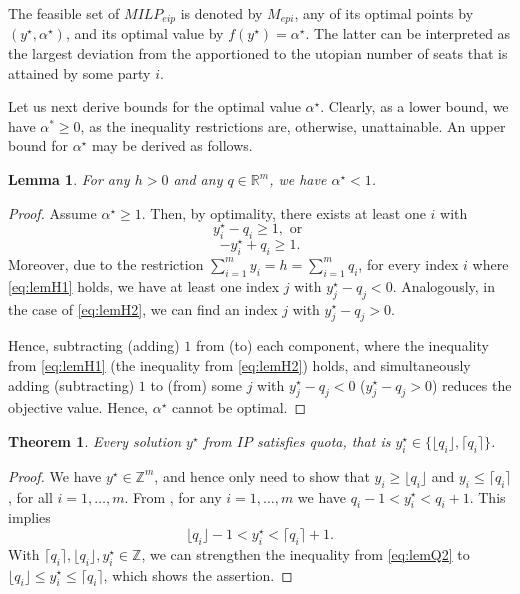 \documentclass[12pt]{article}
\newcommand{\Z}{\mathbb{Z}}
\newcommand{\R}{\mathbb{R}}
\newtheorem{theorem}[definition]{Theorem}
\newtheorem{lemma}[definition]{Lemma}
\begin{document}
The feasible set of $MILP_{eip}$ is denoted by $M_{epi}$, any of its optimal points by $(y^\star,\alpha^\star)$, and its optimal value by $f(y^\star) = \alpha^\star$. The latter can be interpreted as the largest deviation from the apportioned to the utopian number of seats that is attained by some party $i$.

Let us next derive bounds for the optimal value $\alpha^\star$. Clearly, as a lower bound, we have $\alpha^* \geq 0$, as the inequality restrictions are, otherwise, unattainable. An upper bound for $\alpha^\star$ may be derived as follows.

\begin{lemma}
\label{lem:alpha1}
For any $h>0$ and any $q \in \R^m$, we have $\alpha^\star <1$.
\end{lemma}
\begin{proof}
Assume $\alpha^\star \geq 1$. Then, by optimality, there exists at least one $i$ with \begin{equation}\label{eq:lemH1} y^\star_i - q_i \geq 1,\text{ or } \end{equation} \begin{equation}\label{eq:lemH2} -y_i^\star + q_i \geq 1.\end{equation} Moreover, due to the restriction $\sum_{i=1}^m y_i  =  h = \sum_{i=1}^m q_i $, for every index $i$ where \eqref{eq:lemH1} holds, we have at least one index $j$ with $y_j^\star - q_j < 0$. Analogously, in the case of \eqref{eq:lemH2}, we can find an index $j$ with $y_j^\star - q_j > 0$.

Hence, subtracting (adding) $1$ from (to) each component, where the inequality from \eqref{eq:lemH1} (the inequality from \eqref{eq:lemH2}) holds, and simultaneously adding (subtracting) $1$ to (from) some $j$ with $y_j^\star - q_j < 0$ ($y_j^\star - q_j >0$) reduces the objective value. Hence, $\alpha^\star$ cannot be optimal.
\end{proof}

\begin{theorem}
\label{the:quota}
Every solution $y^\star$ from $IP$ satisfies \emph{quota}, that is $ y_i^\star \in \{ \lfloor q_i \rfloor, \lceil q_i \rceil \}$. 
\end{theorem}
\begin{proof}
We have $y^\star \in \Z^m$, and hence only need to show that $y_i \geq \lfloor q_i \rfloor$ and $y_i \leq \lceil q_i \rceil$, for all $i = 1, \dots, m$. From , for any $i = 1, \dots, m$ we have $q_i-1 < y_i^\star < q_i+1$. This implies	 \begin{equation} \label{eq:lemQ2}
\lfloor q_i \rfloor -1 < y_i^\star < \lceil q_i \rceil +1.
\end{equation} With $\lceil q_i \rceil, \lfloor q_i \rfloor, y^\star_i \in \Z$, we can strengthen the inequality from \eqref{eq:lemQ2} to $\lfloor q_i \rfloor \leq y^\star_i \leq \lceil q_i \rceil$, which shows the assertion. 
\end{proof}
\end{document}
